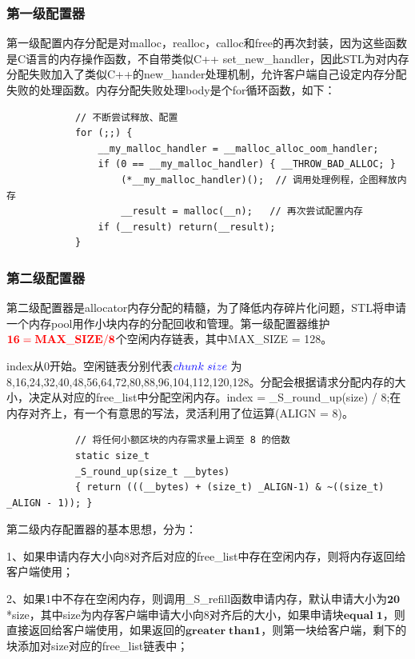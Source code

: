 \documentclass[a4paper,fontset=mac]{ctexart}
\begin{document}
		\subsubsection{第一级配置器}
			第一级配置内存分配是对malloc，realloc，calloc和free的再次封装，因为这些函数是C语言的内存操作函数，不自带类似C++ set\_new\_handler，因此STL为对内存分配失败加入了类似C++的new\_hander处理机制，允许客户端自己设定内存分配失败的处理函数。内存分配失败处理body是个for循环函数，如下：
			\begin{lstlisting}
			// 不断尝试释放、配置
			for (;;) {
				__my_malloc_handler = __malloc_alloc_oom_handler;
				if (0 == __my_malloc_handler) { __THROW_BAD_ALLOC; }   
					(*__my_malloc_handler)();  // 调用处理例程，企图释放内存
					__result = malloc(__n);   // 再次尝试配置内存
				if (__result) return(__result);
			}
			\end{lstlisting}
			
		\subsubsection{第二级配置器}
		第二级配置器是allocator内存分配的精髓，为了降低内存碎片化问题，STL将申请一个内存pool用作小块内存的分配回收和管理。第一级配置器维护$\bold{\color{red}{16 = MAX\_SIZE / 8}}$个空闲内存链表，其中MAX\_SIZE = 128。
		
		index从0开始。空闲链表分别代表$\color{blue}{chunk \; size\;}$为8,16,24,32,40,48,56,64,72,80,88,96,104,112,120,128。分配会根据请求分配内存的大小，决定从对应的free\_list中分配空闲内存。index = \_S\_round\_up(size) / 8;在内存对齐上，有一个有意思的写法，灵活利用了位运算(ALIGN = 8)。
		
		\begin{lstlisting}
			// 将任何小额区块的内存需求量上调至 8 的倍数
			static size_t
			_S_round_up(size_t __bytes)
			{ return (((__bytes) + (size_t) _ALIGN-1) & ~((size_t) _ALIGN - 1)); }
		\end{lstlisting}
		
		
		第二级内存配置器的基本思想，分为：
		
		1、如果申请内存大小向8对齐后对应的free\_list中存在空闲内存，则将内存返回给客户端使用；
		
		2、如果1中不存在空闲内存，则调用\_S\_refill函数申请内存，默认申请大小为$\boldsymbol{20}$*size，其中size为内存客户端申请大小向8对齐后的大小，如果申请块$\boldsymbol{equal\;1}$，则直接返回给客户端使用，如果返回的$\boldsymbol{greater \; than 1}$，则第一块给客户端，剩下的块添加对size对应的free\_list链表中；
		
\end{document}
